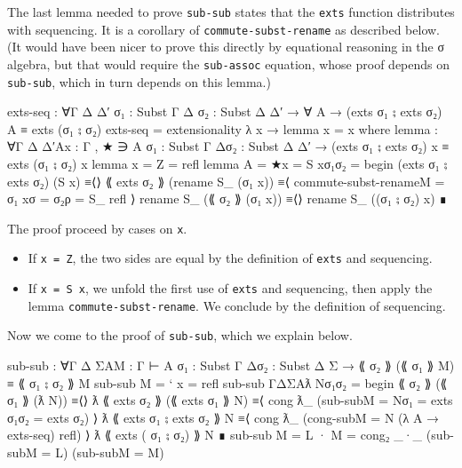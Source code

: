 The last lemma needed to prove \texttt{sub-sub} states that the
\texttt{exts} function distributes with sequencing. It is a corollary of
\texttt{commute-subst-rename} as described below. (It would have been
nicer to prove this directly by equational reasoning in the σ algebra,
but that would require the \texttt{sub-assoc} equation, whose proof
depends on \texttt{sub-sub}, which in turn depends on this lemma.)

\begin{fence}
\begin{code}
exts-seq : ∀{Γ Δ Δ′} {σ₁ : Subst Γ Δ} {σ₂ : Subst Δ Δ′}
         → ∀ {A} → (exts σ₁ ⨟ exts σ₂) {A} ≡ exts (σ₁ ⨟ σ₂)
exts-seq = extensionality λ x → lemma {x = x}
  where
  lemma : ∀{Γ Δ Δ′}{A}{x : Γ , ★ ∋ A} {σ₁ : Subst Γ Δ}{σ₂ : Subst Δ Δ′}
     → (exts σ₁ ⨟ exts σ₂) x ≡ exts (σ₁ ⨟ σ₂) x
  lemma {x = Z} = refl
  lemma {A = ★}{x = S x}{σ₁}{σ₂} =
     begin
       (exts σ₁ ⨟ exts σ₂) (S x)
     ≡⟨⟩
       ⟪ exts σ₂ ⟫ (rename S_ (σ₁ x))
     ≡⟨ commute-subst-rename{M = σ₁ x}{σ = σ₂}{ρ = S_} refl ⟩
       rename S_ (⟪ σ₂ ⟫ (σ₁ x))
     ≡⟨⟩
       rename S_ ((σ₁ ⨟ σ₂) x)
     ∎
\end{code}
\end{fence}

The proof proceed by cases on \texttt{x}.

\begin{itemize}
\item
  If \texttt{x\ =\ Z}, the two sides are equal by the definition of
  \texttt{exts} and sequencing.
\item
  If \texttt{x\ =\ S\ x}, we unfold the first use of \texttt{exts} and
  sequencing, then apply the lemma \texttt{commute-subst-rename}. We
  conclude by the definition of sequencing.
\end{itemize}

Now we come to the proof of \texttt{sub-sub}, which we explain below.

\begin{fence}
\begin{code}
sub-sub : ∀{Γ Δ Σ}{A}{M : Γ ⊢ A} {σ₁ : Subst Γ Δ}{σ₂ : Subst Δ Σ}
            → ⟪ σ₂ ⟫ (⟪ σ₁ ⟫ M) ≡ ⟪ σ₁ ⨟ σ₂ ⟫ M
sub-sub {M = ` x} = refl
sub-sub {Γ}{Δ}{Σ}{A}{ƛ N}{σ₁}{σ₂} =
   begin
     ⟪ σ₂ ⟫ (⟪ σ₁ ⟫ (ƛ N))
   ≡⟨⟩
     ƛ ⟪ exts σ₂ ⟫ (⟪ exts σ₁ ⟫ N)
   ≡⟨ cong ƛ_ (sub-sub{M = N}{σ₁ = exts σ₁}{σ₂ = exts σ₂}) ⟩
     ƛ ⟪ exts σ₁ ⨟ exts σ₂ ⟫ N
   ≡⟨ cong ƛ_ (cong-sub{M = N} (λ {A} → exts-seq) refl) ⟩
     ƛ ⟪ exts ( σ₁ ⨟ σ₂) ⟫ N
   ∎
sub-sub {M = L · M} = cong₂ _·_ (sub-sub{M = L}) (sub-sub{M = M})
\end{code}
\end{fence}

